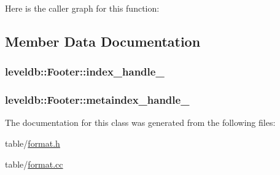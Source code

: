 Here is the caller graph for this function\-:




\subsection{Member Data Documentation}
\hypertarget{classleveldb_1_1_footer_ab930d9087cd95d58531d7698354f0b7b}{
\subsubsection[{index\-\_\-handle\-\_\-}]{ leveldb\-::\-Footer\-::index\-\_\-handle\-\_\-\hspace{0.3cm}{\ttfamily [private]}}}\label{classleveldb_1_1_footer_ab930d9087cd95d58531d7698354f0b7b}
\hypertarget{classleveldb_1_1_footer_acd0ebf81829a0717e2dc832638fc0558}{
\subsubsection[{metaindex\-\_\-handle\-\_\-}]{ leveldb\-::\-Footer\-::metaindex\-\_\-handle\-\_\-\hspace{0.3cm}{\ttfamily [private]}}}\label{classleveldb_1_1_footer_acd0ebf81829a0717e2dc832638fc0558}


The documentation for this class was generated from the following files\-:\begin{DoxyCompactItemize}
\item 
table/\hyperlink{format_8h}{format.\-h}\item 
table/\hyperlink{format_8cc}{format.\-cc}\end{DoxyCompactItemize}

